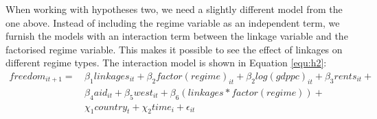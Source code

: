 When working with hypotheses two, we need a slightly different model from the one above. Instead of including the regime variable as an independent term, we furnish the models with an interaction term between the linkage variable and the factorised regime variable. This makes it possible to see the effect of linkages on different regime types. The interaction model is shown in Equation \ref{equ:h2}:
\begin{align} \label{equ:h2}
    freedom_{it+1} =\, & \beta_1 linkages_{it} + \beta_2 factor(regime)_{it} + \beta_2 log(gdppc)_{it} + \beta_3 rents_{it} + \nonumber\\
    & \beta_4 aid_{it} + \beta_5 west_{it} + \beta_6 (linkages * factor(regime)) + \nonumber\\
    & \chi_1 country_t +\chi_2 time_i + \epsilon_{it}
\end{align}